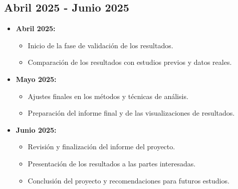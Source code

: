 \subsection{Abril 2025 - Junio 2025}
\begin{itemize}
    \item \textbf{Abril 2025:}
    \begin{itemize}
        \item Inicio de la fase de validación de los resultados.
        \item Comparación de los resultados con estudios previos y datos reales.
    \end{itemize}
    
    \item \textbf{Mayo 2025:}
    \begin{itemize}
        \item Ajustes finales en los métodos y técnicas de análisis.
        \item Preparación del informe final y de las visualizaciones de resultados.
    \end{itemize}
    
    \item \textbf{Junio 2025:}
    \begin{itemize}
        \item Revisión y finalización del informe del proyecto.
        \item Presentación de los resultados a las partes interesadas.
        \item Conclusión del proyecto y recomendaciones para futuros estudios.
    \end{itemize}
\end{itemize}
